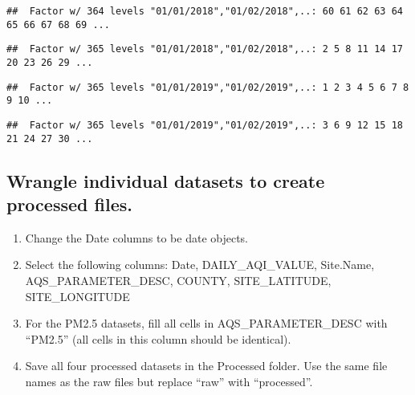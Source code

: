 \documentclass[
]{article}
\newenvironment{Shaded}{\begin{snugshade}}{\end{snugshade}}
\newcommand{\FunctionTok}[1]{\textcolor[rgb]{0.13,0.29,0.53}{\textbf{#1}}}
\newcommand{\NormalTok}[1]{#1}
\newcommand{\SpecialCharTok}[1]{\textcolor[rgb]{0.81,0.36,0.00}{\textbf{#1}}}
\begin{document}
\begin{verbatim}
##  Factor w/ 364 levels "01/01/2018","01/02/2018",..: 60 61 62 63 64 65 66 67 68 69 ...
\end{verbatim}

\begin{Shaded}
\end{Shaded}

\begin{verbatim}
##  Factor w/ 365 levels "01/01/2018","01/02/2018",..: 2 5 8 11 14 17 20 23 26 29 ...
\end{verbatim}

\begin{Shaded}
\end{Shaded}

\begin{verbatim}
##  Factor w/ 365 levels "01/01/2019","01/02/2019",..: 1 2 3 4 5 6 7 8 9 10 ...
\end{verbatim}

\begin{Shaded}
\end{Shaded}

\begin{verbatim}
##  Factor w/ 365 levels "01/01/2019","01/02/2019",..: 3 6 9 12 15 18 21 24 27 30 ...
\end{verbatim}

\hypertarget{wrangle-individual-datasets-to-create-processed-files.}{%
\subsection{Wrangle individual datasets to create processed
files.}\label{wrangle-individual-datasets-to-create-processed-files.}}

\begin{enumerate}
\def\labelenumi{\arabic{enumi}.}
\setcounter{enumi}{2}
\item
  Change the Date columns to be date objects.
\item
  Select the following columns: Date, DAILY\_AQI\_VALUE, Site.Name,
  AQS\_PARAMETER\_DESC, COUNTY, SITE\_LATITUDE, SITE\_LONGITUDE
\item
  For the PM2.5 datasets, fill all cells in AQS\_PARAMETER\_DESC with
  ``PM2.5'' (all cells in this column should be identical).
\item
  Save all four processed datasets in the Processed folder. Use the same
  file names as the raw files but replace ``raw'' with ``processed''.
\end{enumerate}
\end{document}
